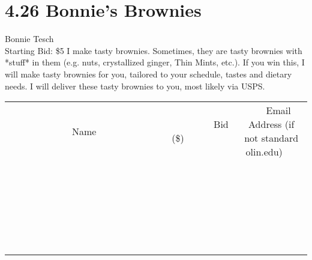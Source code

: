 \documentclass[11pt]{article}
\begin{document}
\section*{4.26 Bonnie's Brownies}
Bonnie Tesch
\\
Starting Bid: \$5
\newline
I make tasty brownies. Sometimes, they are tasty brownies with *stuff* in them (e.g. nuts, crystallized ginger, Thin Mints, etc.). If you win this, I will make tasty brownies for you, tailored to your schedule, tastes and dietary needs. I will deliver these tasty brownies to you, most likely via USPS.
\\[6ex]
\begin{tabular}{c c c}
~~~~~~~~~~~~~Name~~~~~~~~~~~~~ & ~~~~~~~~~Bid (\$)~~~~~~~~~  & ~~~Email Address (if not standard olin.edu)~~~\\
 & & \\
\hline
 & & \\
\hline
 & & \\
\hline
 & & \\
\hline
 & & \\
\hline
 & & \\
\hline
 & & \\
\hline
 & & \\
\hline
 & & \\
\hline
 & & \\
\hline
 & & \\
\hline
 & & \\
\hline
 & & \\
\hline
 & & \\
\hline
 & & \\
\hline
 & & \\
\hline
 & & \\
\hline
 & & \\
\hline
 & & \\
\hline
 & & \\
\hline
 & & \\
\hline
 & & \\
\hline
 & & \\
\hline
 & & \\
\hline
 & & \\
\hline
 & & \\
\hline
\end{tabular}
\newpage
\end{document}
